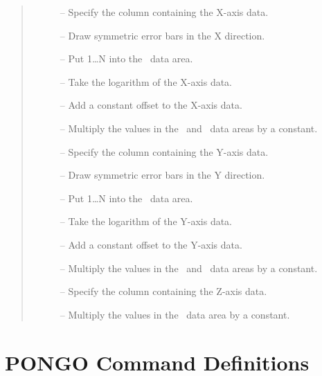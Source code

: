 \begin {quote}
\begin {description}
\item [] -- Specify the column containing the
                                      X-axis data.
\item [] -- Draw symmetric error bars in the X direction.
\item [] -- Put 1\ldots N into the \xcol\ data area.
\item [] -- Take the logarithm of the
                                            X-axis data.
\item [] -- Add a constant offset to the
                                      X-axis data.
\item [] -- Multiply the values in the \xcol\ and \excol\ data areas
                         by a constant.
\item [] -- Specify the column containing the
                                      Y-axis data.
\item [] -- Draw symmetric error bars in the Y direction.
\item [] -- Put 1\ldots N into the \ycol\ data
                                      area.
\item [] -- Take the logarithm of the
                                            Y-axis data.
\item [] -- Add a constant offset to the
                                      Y-axis data.
\item [] -- Multiply the values in the \ycol\ and \eycol\ data areas
                         by a constant.
\item [] -- Specify the column containing the
                                      Z-axis data.
\item [] -- Multiply the values in the \zcol\ data area by a
                         constant.
\end {description}
\end {quote}
\normalsize

\newpage
\section{PONGO Command Definitions} \label{defn_sect}

